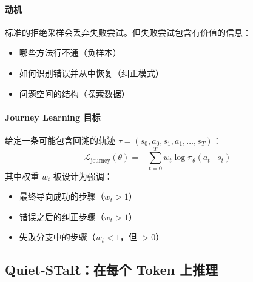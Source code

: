 \paragraph{动机}
\label{motivation-dup4}

标准的拒绝采样会丢弃失败尝试。但失败尝试包含有价值的信息：

\begin{itemize}
  \item 哪些方法行不通（负样本）
  \item 如何识别错误并从中恢复（纠正模式）
  \item 问题空间的结构（探索数据）
\end{itemize}

\paragraph{Journey Learning 目标}
\label{journey-learning-objective}

给定一条可能包含回溯的轨迹 $\tau = (s_0, a_0, s_1, a_1, \ldots, s_T)$：
\begin{equation}
    \mathcal{L}_{\text{journey}}(\theta) = -\sum_{t=0}^{T} w_t \log \pi_\theta(a_t \mid s_t)
\end{equation}
其中权重 $w_t$ 被设计为强调：

\begin{itemize}
  \item 最终导向成功的步骤（$w_t > 1$）
  \item 错误之后的纠正步骤（$w_t > 1$）
  \item 失败分支中的步骤（$w_t < 1$，但 $> 0$）
\end{itemize}

\subsection{Quiet-STaR：在每个 Token 上推理}
\label{quiet-star-reasoning-at-every-token}

